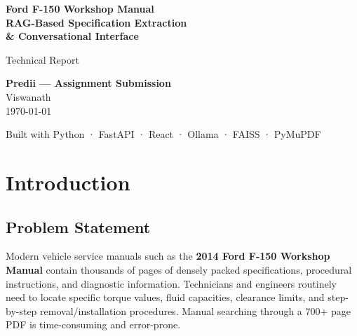 \documentclass[12pt, a4paper]{article}
\begin{document}
\begin{titlepage}
\centering
\vspace*{2cm}

{\Huge\bfseries Ford F-150 Workshop Manual\\[6pt]
RAG-Based Specification Extraction\\[6pt]
\& Conversational Interface\par}

\vspace{1.5cm}

{\Large Technical Report\par}

\vspace{2cm}

{\large
\textbf{Predii — Assignment Submission}\\[12pt]
Viswanath\\[6pt]
\today
\par}

\vfill

{\small Built with Python · FastAPI · React · Ollama · FAISS · PyMuPDF}

\end{titlepage}

\tableofcontents
\newpage

\section{Introduction}

\subsection{Problem Statement}

Modern vehicle service manuals such as the \textbf{2014 Ford F-150 Workshop Manual} contain thousands of pages of densely packed specifications, procedural instructions, and diagnostic information. Technicians and engineers routinely need to locate specific torque values, fluid capacities, clearance limits, and step-by-step removal/installation procedures. Manual searching through a 700+ page PDF is time-consuming and error-prone.
\end{document}
